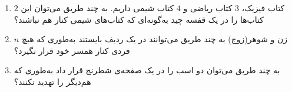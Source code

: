 \EXERCISE
\begin{enumerate}
\item
$2$
کتاب فیزیک،
$3$
کتاب ریاضی و
$4$
کتاب شیمی داریم. به چند طریق می‌توان این کتاب‌ها را در یک قفسه چید به‌گونه‌ای که کتاب‌های شیمی کنار هم نباشند؟
\item
$n$
زن و شوهر(زوج) به چند طریق می‌توانند در یک ردیف بایستند به‌طوری که هیچ فردی کنار همسر خود قرار نگیرد؟
\item
به چند طریق می‌توان دو اسب را در یک صفحه‌ی شطرنج قرار داد به‌طوری که هم‌دیگر را تهدید نکنند؟
\end{enumerate}